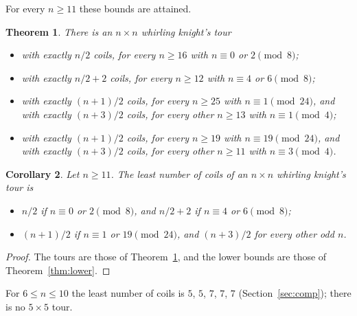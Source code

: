 \documentclass[11pt]{amsart}
\newtheorem{theorem}{Theorem}
\newtheorem{corollary}[theorem]{Corollary}
\theoremstyle{remark}
\begin{document}
For every $n\ge11$ these bounds are attained.
\begin{theorem}\label{thm:half}
There is an $n\times n$ whirling knight's tour
\begin{itemize}
\item[(a)] with exactly $n/2$ coils, for every $n\ge16$ with $n\equiv0$ or $2\pmod 8$;
\item[(b)] with exactly $n/2+2$ coils, for every $n\ge12$ with $n\equiv4$ or $6\pmod 8$;
\item[(c)] with exactly $(n+1)/2$ coils, for every $n\ge25$ with $n\equiv1\pmod{24}$, and with exactly $(n+3)/2$
coils, for every other $n\ge13$ with $n\equiv1\pmod 4$;
\item[(d)] with exactly $(n+1)/2$ coils, for every $n\ge19$ with $n\equiv19\pmod{24}$, and with exactly $(n+3)/2$
coils, for every other $n\ge11$ with $n\equiv3\pmod 4$.
\end{itemize}
\end{theorem}

\begin{corollary}\label{cor:least}
Let $n\ge11$. The least number of coils of an $n\times n$ whirling knight's tour is
\begin{itemize}
\item $n/2$ if $n\equiv0$ or $2\pmod 8$, and $n/2+2$ if $n\equiv4$ or $6\pmod 8$;
\item $(n+1)/2$ if $n\equiv1$ or $19\pmod{24}$, and $(n+3)/2$ for every other odd $n$.
\end{itemize}
\end{corollary}
\begin{proof}
The tours are those of Theorem~\ref{thm:half}, and the lower bounds are those of Theorem~\ref{thm:lower}.
\end{proof}
For $6\le n\le10$ the least number of coils is $5$, $5$, $7$, $7$, $7$ (Section~\ref{sec:comp}); there is no
$5\times5$ tour.
\end{document}
